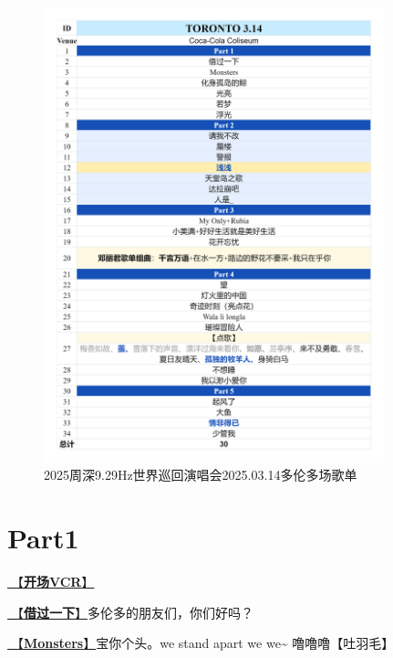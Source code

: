 \documentclass[]{ctexbook}
\begin{document}
\begin{figure}

{\centering \includegraphics[width=280pt]{img/playlists/playlists-toronto-20250314} 

}

\caption{2025周深9.29Hz世界巡回演唱会2025.03.14多伦多场歌单}\label{fig:unnamed-chunk-185}
\end{figure}

\newpage

\section{Part1}\label{Toronto-20250314-part1}

\hyperref[opening-vcr]{🎥【\textbf{开场VCR}】}

\hyperref[I-will-go-my-way]{🎵【\textbf{借过一下}】}多伦多的朋友们，你们好吗？

\hyperref[Monsters]{🎵【\textbf{Monsters}】}宝你个头。we stand apart we we\textasciitilde{} 噜噜噜【吐羽毛】
\end{document}
